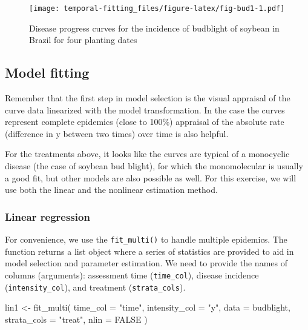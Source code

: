 \documentclass[
  letterpaper,
]{book}
\newenvironment{Shaded}{\begin{snugshade}}{\end{snugshade}}
\newcommand{\AttributeTok}[1]{\textcolor[rgb]{0.40,0.45,0.13}{#1}}
\newcommand{\ConstantTok}[1]{\textcolor[rgb]{0.56,0.35,0.01}{#1}}
\newcommand{\FunctionTok}[1]{\textcolor[rgb]{0.28,0.35,0.67}{#1}}
\newcommand{\NormalTok}[1]{\textcolor[rgb]{0.00,0.23,0.31}{#1}}
\newcommand{\OtherTok}[1]{\textcolor[rgb]{0.00,0.23,0.31}{#1}}
\newcommand{\StringTok}[1]{\textcolor[rgb]{0.13,0.47,0.30}{#1}}
\begin{document}
\begin{figure}

{\centering \texttt{[image: temporal-fitting\_files/figure-latex/fig-bud1-1.pdf]}

}

\caption{\label{fig-bud1}Disease progress curves for the incidence of
budblight of soybean in Brazil for four planting dates}

\end{figure}

\hypertarget{model-fitting-1}{%
\subsection{Model fitting}\label{model-fitting-1}}

Remember that the first step in model selection is the visual appraisal
of the curve data linearized with the model transformation. In the case
the curves represent complete epidemics (close to 100\%) appraisal of
the absolute rate (difference in y between two times) over time is also
helpful.

For the treatments above, it looks like the curves are typical of a
monocyclic disease (the case of soybean bud blight), for which the
monomolecular is usually a good fit, but other models are also possible
as well. For this exercise, we will use both the linear and the
nonlinear estimation method.

\hypertarget{linear-regression}{%
\subsubsection{Linear regression}\label{linear-regression}}

For convenience, we use the \texttt{fit\_multi()} to handle multiple
epidemics. The function returns a list object where a series of
statistics are provided to aid in model selection and parameter
estimation. We need to provide the names of columns (arguments):
assessment time (\texttt{time\_col}), disease incidence
(\texttt{intensity\_col}), and treatment (\texttt{strata\_cols}).

\begin{Shaded}
\begin{Highlighting}[]
\NormalTok{lin1 }\OtherTok{\textless{}{-}} \FunctionTok{fit\_multi}\NormalTok{(}
  \AttributeTok{time\_col =} \StringTok{"time"}\NormalTok{,}
  \AttributeTok{intensity\_col =} \StringTok{"y"}\NormalTok{,}
  \AttributeTok{data =}\NormalTok{ budblight,}
  \AttributeTok{strata\_cols =} \StringTok{"treat"}\NormalTok{,}
  \AttributeTok{nlin =} \ConstantTok{FALSE}
\NormalTok{)}
\end{Highlighting}
\end{Shaded}
\end{document}
